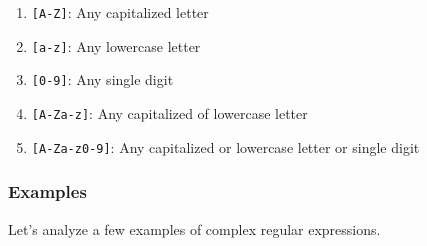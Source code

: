 \documentclass[
  letterpaper,
  DIV=11,
  numbers=noendperiod]{scrreprt}
\providecommand{\tightlist}{%
  \setlength{\itemsep}{0pt}\setlength{\parskip}{0pt}}\usepackage{longtable,booktabs,array}
\begin{document}
\begin{enumerate}
\def\labelenumi{\arabic{enumi}.}
\tightlist
\item
  \texttt{{[}A-Z{]}}: Any capitalized letter
\item
  \texttt{{[}a-z{]}}: Any lowercase letter
\item
  \texttt{{[}0-9{]}}: Any single digit
\item
  \texttt{{[}A-Za-z{]}}: Any capitalized of lowercase letter
\item
  \texttt{{[}A-Za-z0-9{]}}: Any capitalized or lowercase letter or
  single digit
\end{enumerate}

\subsubsection{Examples}\label{examples-1}

Let's analyze a few examples of complex regular expressions.
\end{document}
